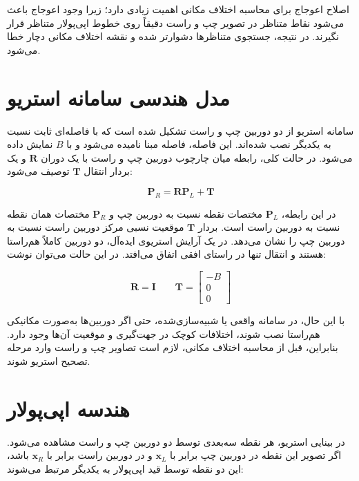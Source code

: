 اصلاح اعوجاج برای محاسبه اختلاف مکانی اهمیت زیادی دارد؛ زیرا وجود اعوجاج باعث می‌شود نقاط متناظر در تصویر چپ و راست دقیقاً روی خطوط اپی‌پولار متناظر قرار نگیرند. در نتیجه، جستجوی متناظرها دشوارتر شده و نقشه اختلاف مکانی دچار خطا می‌شود.

\section{مدل هندسی سامانه استریو}

سامانه استریو از دو دوربین چپ و راست تشکیل شده است که با فاصله‌ای ثابت نسبت به یکدیگر نصب شده‌اند. این فاصله، فاصله مبنا%
نامیده می‌شود و با \(B\) نمایش داده می‌شود. در حالت کلی، رابطه میان چارچوب دوربین چپ و راست با یک دوران \(\mathbf{R}\) و یک بردار انتقال \(\mathbf{T}\) توصیف می‌شود:

\begin{equation}
	\mathbf{P}_R =
	\mathbf{R}\mathbf{P}_L
	+
	\mathbf{T}
	\label{eq:left_right_extrinsic_relation}
\end{equation}

در این رابطه، \(\mathbf{P}_L\) مختصات نقطه نسبت به دوربین چپ و \(\mathbf{P}_R\) مختصات همان نقطه نسبت به دوربین راست است. بردار \(\mathbf{T}\) موقعیت نسبی مرکز دوربین راست نسبت به دوربین چپ را نشان می‌دهد. در یک آرایش استریوی ایده‌آل، دو دوربین کاملاً هم‌راستا هستند و انتقال تنها در راستای افقی اتفاق می‌افتد. در این حالت می‌توان نوشت:

\begin{equation}
	\mathbf{R} = \mathbf{I}
	\qquad
	\mathbf{T} =
	\begin{bmatrix}
		-B \\
		0 \\
		0
	\end{bmatrix}
\end{equation}

با این حال، در سامانه واقعی یا شبیه‌سازی‌شده، حتی اگر دوربین‌ها به‌صورت مکانیکی هم‌راستا نصب شوند، اختلافات کوچک در جهت‌گیری و موقعیت آن‌ها وجود دارد. بنابراین، قبل از محاسبه اختلاف مکانی، لازم است تصاویر چپ و راست وارد مرحله تصحیح استریو شوند.

\section{هندسه اپی‌پولار}

در بینایی استریو، هر نقطه سه‌بعدی توسط دو دوربین چپ و راست مشاهده می‌شود. اگر تصویر این نقطه در دوربین چپ برابر با \(\mathbf{x}_L\) و در دوربین راست برابر با \(\mathbf{x}_R\) باشد، این دو نقطه توسط قید اپی‌پولار به یکدیگر مرتبط می‌شوند:

